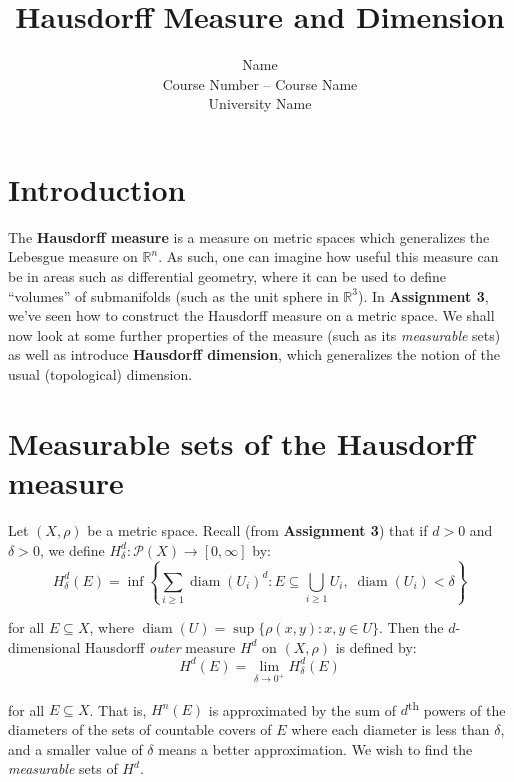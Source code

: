 \documentclass{article}[11pt]
\newcommand*{\R}{\mathbb{R}}
\DeclareMathOperator*{\diam}{diam}
\theoremstyle{dotless}
\begin{document}
\nocite{*} %

\title{Hausdorff Measure and Dimension}

\author{Name \\
Course Number – Course Name \\
University Name}

\maketitle

\section*{Introduction}

The \textbf{Hausdorff measure} is a measure on metric spaces which generalizes the Lebesgue measure on $\R^n$.
As such, one can imagine how useful this measure can be in areas such as differential geometry, where it
can be used to define ``volumes'' of submanifolds (such as the unit sphere in $\R^3$).
In \textbf{Assignment 3}, we've seen how to construct the Hausdorff measure on a metric space. We shall now look at
some further properties of the measure (such as its \textit{measurable} sets) as well as introduce 
\textbf{Hausdorff dimension}, which generalizes the notion of the usual (topological) dimension.


\section{Measurable sets of the Hausdorff measure}

Let $(X, \rho)$ be a metric space.
Recall (from \textbf{Assignment 3}) that if $d > 0$ and $\delta > 0$, we define $H_\delta^d : \mathcal{P}(X) \to [0,\infty]$ by:
\[ H_\delta^d(E) = \inf \left\{ \sum_{i \geqslant 1} \diam(U_i)^d : E \subseteq \bigcup_{i \geqslant 1} U_i, \; \diam(U_i) < \delta \right\} \]

\noindent
for all $E \subseteq X$,
where $\diam(U) = \sup \{ \rho(x,y) : x,y \in U \}$. Then the $d$-dimensional Hausdorff \textit{outer} measure $H^d$ on $(X, \rho)$ is defined by:
\[ H^d(E) = \lim_{\delta \to 0^+} H_\delta^d(E) \]

\noindent
for all $E \subseteq X$. That is, $H^n(E)$ is approximated by
the sum of $d$\textsuperscript{th} powers of the diameters of the sets of countable covers of $E$ where each diameter is less than $\delta$, 
and a smaller value of $\delta$ means a better
approximation. We wish to find the \textit{measurable} sets of $H^d$.
\bigskip
\end{document}
